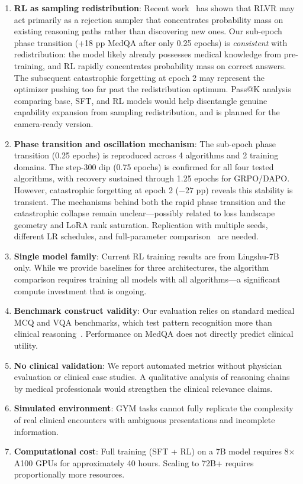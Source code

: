 \documentclass{article}
\begin{document}
\begin{enumerate}[nosep, leftmargin=*]
    \item \textbf{RL as sampling redistribution}: Recent work~\citep{yue2025rlvr} has shown that RLVR may act primarily as a rejection sampler that concentrates probability mass on existing reasoning paths rather than discovering new ones. Our sub-epoch phase transition (+18 pp MedQA after only 0.25 epochs) is \emph{consistent} with redistribution: the model likely already possesses medical knowledge from pre-training, and RL rapidly concentrates probability mass on correct answers. The subsequent catastrophic forgetting at epoch 2 may represent the optimizer pushing too far past the redistribution optimum. Pass@K analysis comparing base, SFT, and RL models would help disentangle genuine capability expansion from sampling redistribution, and is planned for the camera-ready version.
    \item \textbf{Phase transition and oscillation mechanism}: The sub-epoch phase transition (0.25 epochs) is reproduced across 4 algorithms and 2 training domains. The step-300 dip (0.75 epochs) is confirmed for all four tested algorithms, with recovery sustained through 1.25 epochs for GRPO/DAPO. However, catastrophic forgetting at epoch 2 ($-27$ pp) reveals this stability is transient. The mechanisms behind both the rapid phase transition and the catastrophic collapse remain unclear---possibly related to loss landscape geometry and LoRA rank saturation. Replication with multiple seeds, different LR schedules, and full-parameter comparison~\citep{jin2025rlheals} are needed.
    \item \textbf{Single model family}: Current RL training results are from Lingshu-7B only. While we provide baselines for three architectures, the algorithm comparison requires training all models with all algorithms---a significant compute investment that is ongoing.
    \item \textbf{Benchmark construct validity}: Our evaluation relies on standard medical MCQ and VQA benchmarks, which test pattern recognition more than clinical reasoning~\citep{kauf2025construct}. Performance on MedQA does not directly predict clinical utility.
    \item \textbf{No clinical validation}: We report automated metrics without physician evaluation or clinical case studies. A qualitative analysis of reasoning chains by medical professionals would strengthen the clinical relevance claims.
    \item \textbf{Simulated environment}: GYM tasks cannot fully replicate the complexity of real clinical encounters with ambiguous presentations and incomplete information.
    \item \textbf{Computational cost}: Full training (SFT + RL) on a 7B model requires 8$\times$A100 GPUs for approximately 40 hours. Scaling to 72B+ requires proportionally more resources.
\end{enumerate}
\end{document}
